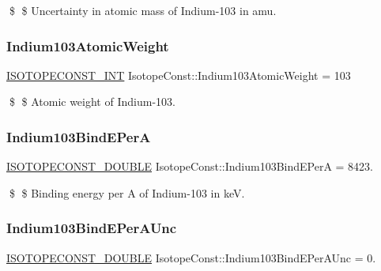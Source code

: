 \$ \$ Uncertainty in atomic mass of Indium-\/103 in amu. \mbox{\label{group___isotope_const-_indium-_in103_ga31f897aab54382b5d93111bedd3b1f7a}} 
\subsubsection{\texorpdfstring{Indium103\+Atomic\+Weight}{Indium103AtomicWeight}}
{\footnotesize\ttfamily \mbox{\hyperlink{group___isotope_const-_macros_ga5f18360b3e99483a35c32d789e62621c}{I\+S\+O\+T\+O\+P\+E\+C\+O\+N\+S\+T\+\_\+\+I\+NT}} Isotope\+Const\+::\+Indium103\+Atomic\+Weight = 103}

\$ \$ Atomic weight of Indium-\/103. \mbox{\label{group___isotope_const-_indium-_in103_ga53ffbfb3c49421f6f6797f99f0ac9686}} 
\subsubsection{\texorpdfstring{Indium103\+Bind\+E\+PerA}{Indium103BindEPerA}}
{\footnotesize\ttfamily \mbox{\hyperlink{group___isotope_const-_macros_ga8f45a7272ce02c0b4c65c44636ed719a}{I\+S\+O\+T\+O\+P\+E\+C\+O\+N\+S\+T\+\_\+\+D\+O\+U\+B\+LE}} Isotope\+Const\+::\+Indium103\+Bind\+E\+PerA = 8423.}

\$ \$ Binding energy per A of Indium-\/103 in keV. \mbox{\label{group___isotope_const-_indium-_in103_gad985173fa8e455db5c60b3d7da3fbe61}} 
\subsubsection{\texorpdfstring{Indium103\+Bind\+E\+Per\+A\+Unc}{Indium103BindEPerAUnc}}
{\footnotesize\ttfamily \mbox{\hyperlink{group___isotope_const-_macros_ga8f45a7272ce02c0b4c65c44636ed719a}{I\+S\+O\+T\+O\+P\+E\+C\+O\+N\+S\+T\+\_\+\+D\+O\+U\+B\+LE}} Isotope\+Const\+::\+Indium103\+Bind\+E\+Per\+A\+Unc = 0.}

